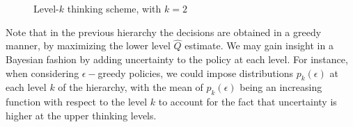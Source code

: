 \begin{figure}[!ht]
\centering
{}
\caption{Level-$k$ thinking scheme, with $k=2$}\label{fig:lev2_scheme}
\end{figure}

Note that in the previous hierarchy the decisions are obtained 
in a greedy manner, by maximizing the lower level
$\hat{Q}$ estimate. We may gain insight in a Bayesian fashion by adding uncertainty to the policy at each level. For instance, 
when considering $\epsilon-$greedy policies,
we could impose distributions $p_k(\epsilon)$ at each level $k$ of the hierarchy,
with the mean of $p_k(\epsilon)$ being an increasing function with respect to 
the level $k$ to account for the fact that uncertainty is higher
at the upper thinking levels. 


